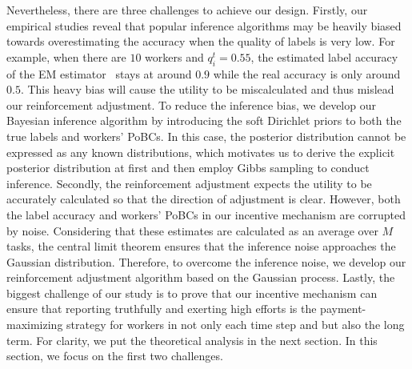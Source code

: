 Nevertheless, there are three challenges to achieve our design. Firstly, our empirical studies reveal that popular inference algorithms may be heavily biased towards overestimating the accuracy when the quality of labels is very low. For example, when there are $10$ workers and $q_i^t=0.55$, the estimated label accuracy of the EM estimator~\cite{dawid1979maximum,raykar2010learning} stays at around $0.9$ while the real accuracy is only around $0.5$.
This heavy bias will cause the utility to be miscalculated and thus mislead our reinforcement adjustment.
To reduce the inference bias, we develop our Bayesian inference algorithm by introducing the soft Dirichlet priors to both the true labels and workers' PoBCs.
In this case, the posterior distribution cannot be expressed as any known distributions, which motivates us to derive the explicit posterior distribution at first and then employ Gibbs sampling to conduct inference.
{\color{red}Secondly, the reinforcement adjustment expects the utility to be accurately calculated so that the direction of adjustment is clear.
However, both the label accuracy and workers' PoBCs in our incentive mechanism are corrupted by noise.
Considering that these estimates are calculated as an average over $M$ tasks, the central limit theorem ensures that the inference noise approaches the Gaussian distribution.
Therefore, to overcome the inference noise, we develop our reinforcement adjustment algorithm based on the Gaussian process.}
Lastly, the biggest challenge of our study is to prove that our incentive mechanism can ensure that reporting truthfully and exerting high efforts is the payment-maximizing strategy for workers in not only each time step and but also the long term.
For clarity, we put the theoretical analysis in the next section.
In this section, we focus on the first two challenges.






